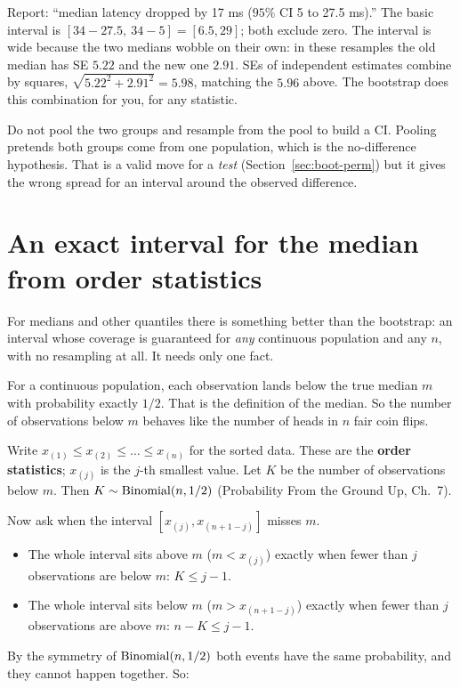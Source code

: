 Report: ``median latency dropped by 17 ms ($95\%$ CI 5 to 27.5 ms).'' The basic
interval is $[34 - 27.5,\ 34 - 5] = [6.5, 29]$; both exclude zero. The
interval is wide because the two medians wobble on their own: in these
resamples the old median has SE $5.22$ and the new one $2.91$. SEs of
independent estimates combine by squares, $\sqrt{5.22^2 + 2.91^2} = 5.98$,
matching the $5.96$ above. The bootstrap does this combination for you, for
any statistic.

\begin{trapbox}
Do not pool the two groups and resample from the pool to build a CI. Pooling
pretends both groups come from one population, which is the no-difference
hypothesis. That is a valid move for a \emph{test} (Section~\ref{sec:boot-perm})
but it gives the wrong spread for an interval around the observed difference.
\end{trapbox}

\section{An exact interval for the median from order statistics}
\label{sec:boot-exact}

For medians and other quantiles there is something better than the bootstrap:
an interval whose coverage is guaranteed for \emph{any} continuous population
and any $n$, with no resampling at all. It needs only one fact.

\begin{intuitionbox}
For a continuous population, each observation lands below the true median $m$
with probability exactly $1/2$. That is the definition of the median. So the
number of observations below $m$ behaves like the number of heads in $n$ fair
coin flips.
\end{intuitionbox}

Write $x_{(1)} \le x_{(2)} \le \dots \le x_{(n)}$ for the sorted data. These
are the \textbf{order statistics}; $x_{(j)}$ is the $j$-th smallest value. Let
$K$ be the number of observations below $m$. Then $K \sim \operatorname{Binomial}(n, 1/2)$
(Probability From the Ground Up, Ch.~7).

Now ask when the interval $[x_{(j)}, x_{(n+1-j)}]$ misses $m$.
\begin{itemize}
  \item The whole interval sits above $m$ ($m < x_{(j)}$) exactly when fewer
  than $j$ observations are below $m$: $K \le j - 1$.
  \item The whole interval sits below $m$ ($m > x_{(n+1-j)}$) exactly when
  fewer than $j$ observations are above $m$: $n - K \le j-1$.
\end{itemize}
By the symmetry of $\operatorname{Binomial}(n,1/2)$ both events have the same probability, and they
cannot happen together. So:

